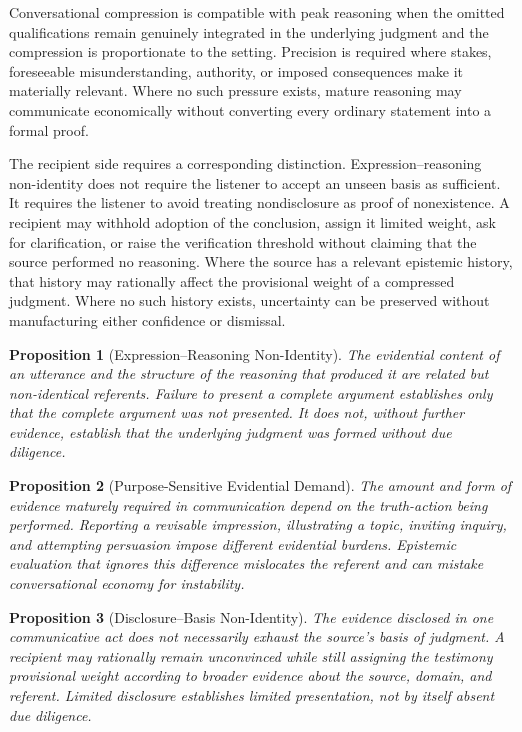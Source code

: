 \documentclass[11pt]{article}
\newtheorem{proposition}{Proposition}
\begin{document}
Conversational compression is compatible with peak reasoning when the omitted qualifications remain genuinely integrated in the underlying judgment and the compression is proportionate to the setting. Precision is required where stakes, foreseeable misunderstanding, authority, or imposed consequences make it materially relevant. Where no such pressure exists, mature reasoning may communicate economically without converting every ordinary statement into a formal proof.

The recipient side requires a corresponding distinction. Expression--reasoning non-identity does not require the listener to accept an unseen basis as sufficient. It requires the listener to avoid treating nondisclosure as proof of nonexistence. A recipient may withhold adoption of the conclusion, assign it limited weight, ask for clarification, or raise the verification threshold without claiming that the source performed no reasoning. Where the source has a relevant epistemic history, that history may rationally affect the provisional weight of a compressed judgment. Where no such history exists, uncertainty can be preserved without manufacturing either confidence or dismissal.

\begin{proposition}[Expression--Reasoning Non-Identity]
The evidential content of an utterance and the structure of the reasoning that produced it are related but non-identical referents. Failure to present a complete argument establishes only that the complete argument was not presented. It does not, without further evidence, establish that the underlying judgment was formed without due diligence.
\end{proposition}

\begin{proposition}[Purpose-Sensitive Evidential Demand]
The amount and form of evidence maturely required in communication depend on the truth-action being performed. Reporting a revisable impression, illustrating a topic, inviting inquiry, and attempting persuasion impose different evidential burdens. Epistemic evaluation that ignores this difference mislocates the referent and can mistake conversational economy for instability.
\end{proposition}

\begin{proposition}[Disclosure--Basis Non-Identity]
The evidence disclosed in one communicative act does not necessarily exhaust the source's basis of judgment. A recipient may rationally remain unconvinced while still assigning the testimony provisional weight according to broader evidence about the source, domain, and referent. Limited disclosure establishes limited presentation, not by itself absent due diligence.
\end{proposition}
\end{document}
